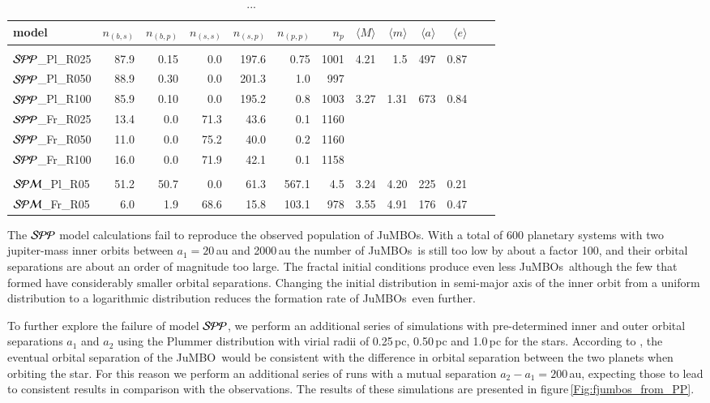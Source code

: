 \documentclass[aa]{lib/aa}
\newcommand{\jumbo}{\mbox{JuMBO}}
\newcommand{\jumbos}{\mbox{JuMBOs}}
\begin{document}
\begin{table}
 \caption{...}
 \label{Tab:model_PP}
 \centering 
 \begin{tabular}{lrrrrrrrrrrrr}
 \hline\hline
model & $n_{(b,s)}$&$n_{(b,p)}$ & $n_{(s,s)}$ & $n_{(s,p)}$ & $n_{(p,p)}$ & $n_{p}$ & $\langle M \rangle$ & $\langle m \rangle$ & $\langle a \rangle$ & $\langle e \rangle$ \\
        \hline \vspace{-0.75em}\\
${\cal SPP}$\_Pl\_R025 &87.9& 0.15 &0.0& 197.6 & 0.75 &1001 & 4.21 & 1.5  & 497 & 0.87 \\
${\cal SPP}$\_Pl\_R050 &88.9& 0.30 &0.0& 201.3 & 1.0  & 997 \\
${\cal SPP}$\_Pl\_R100 &85.9& 0.10 &0.0& 195.2 & 0.8  & 1003 & 3.27 & 1.31 & 673 & 0.84 \\
${\cal SPP}$\_Fr\_R025 & 13.4 & 0.0 & 71.3 & 43.6 & 0.1 & 1160 \\
${\cal SPP}$\_Fr\_R050 & 11.0 & 0.0 & 75.2 & 40.0 & 0.2 & 1160 \\
${\cal SPP}$\_Fr\_R100 & 16.0 & 0.0 & 71.9 & 42.1 & 0.1 & 1158 \\
 \hline
  \hline \vspace{-0.75em}\\
  ${\cal SPM}$\_Pl\_R05 &51.2 & 50.7 & 0.0 & 61.3 & 567.1 & 4.5 & 3.24 & 4.20 & 225 & 0.21 \\
  ${\cal SPM}$\_Fr\_R05 &6.0 & 1.9 & 68.6 & 15.8 & 103.1 & 978 & 3.55 & 4.91 & 176 & 0.47 \\
  \hline
 \end{tabular}
\end{table}

The ${\cal SPP}$ model calculations fail to reproduce the observed
population of \jumbos. With a total of 600 planetary systems with two
jupiter-mass inner orbits between $a_1=20$\,au and 2000\,au the number
of \jumbos\, is still too low by about a factor 100, and their orbital
separations are about an order of magnitude too large.  The fractal
initial conditions produce even less \jumbos\, although the few that
formed have considerably smaller orbital separations.  Changing the
initial distribution in semi-major axis of the inner orbit from a
uniform distribution to a logarithmic distribution reduces the
formation rate of \jumbos\, even further.

To further explore the failure of model ${\cal SPP}$, we perform an
additional series of simulations with pre-determined inner and outer
orbital separations $a_1$ and $a_2$ using the Plummer distribution
with virial radii of 0.25\,pc, 0.50\,pc and 1.0\,pc for the stars.
According to \cite{2023arXiv231006016W}, the eventual orbital
separation of the \jumbo\, would be consistent with the difference in
orbital separation between the two planets when orbiting the star. For
this reason we perform an additional series of runs with a mutual
separation $a_2-a_1 = 200$\,au, expecting those to lead to consistent
results in comparison with the observations.  The results of these
simulations are presented in figure\,\ref{Fig:fjumbos_from_PP}.
\end{document}
